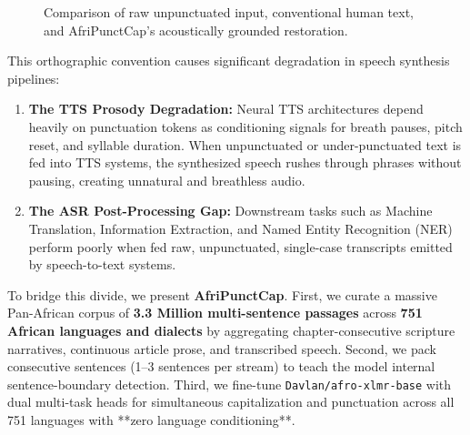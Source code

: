\documentclass[11pt,a4paper]{article}
\begin{document}
\begin{figure}[t]
\centering
{}
\caption{Comparison of raw unpunctuated input, conventional human text, and AfriPunctCap's acoustically grounded restoration.}
\label{fig:teaser}
\end{figure}

This orthographic convention causes significant degradation in speech synthesis pipelines:
\begin{enumerate}
    \item \textbf{The TTS Prosody Degradation:} Neural TTS architectures depend heavily on punctuation tokens as conditioning signals for breath pauses, pitch reset, and syllable duration. When unpunctuated or under-punctuated text is fed into TTS systems, the synthesized speech rushes through phrases without pausing, creating unnatural and breathless audio.
    \item \textbf{The ASR Post-Processing Gap:} Downstream tasks such as Machine Translation, Information Extraction, and Named Entity Recognition (NER) perform poorly when fed raw, unpunctuated, single-case transcripts emitted by speech-to-text systems.
\end{enumerate}

To bridge this divide, we present \textbf{AfriPunctCap}. First, we curate a massive Pan-African corpus of \textbf{3.3 Million multi-sentence passages} across \textbf{751 African languages and dialects} by aggregating chapter-consecutive scripture narratives, continuous article prose, and transcribed speech. Second, we pack consecutive sentences (1--3 sentences per stream) to teach the model internal sentence-boundary detection. Third, we fine-tune \texttt{Davlan/afro-xlmr-base} \cite{adelani2022afro} with dual multi-task heads for simultaneous capitalization and punctuation across all 751 languages with **zero language conditioning**. 
\end{document}
